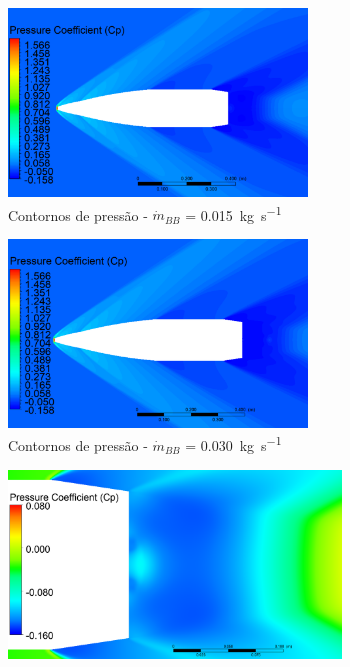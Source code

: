 \begin{figure}[!ht]
	\centering
	\begin{subfigure}[b]{0.47\textwidth} %
        \centering
        \includegraphics[height=5cm,width=\textwidth]{contorno-pressao-2306-vazao-0015-1pol.png}
        \caption{Contornos de pressão - \(\Dot{m}_{BB}\) = \qty{0,015}{\kilogram\per\second}}
        \label{fig:contorno-pressao-bb-1pol-vazao0015}
    \end{subfigure}
    \hfill
    \begin{subfigure}[b]{0.47\textwidth} %
        \centering
        \includegraphics[height=5cm,width=\textwidth]{contorno-pressao-2306-vazao-0030-1pol.png}
        \caption{Contornos de pressão - \(\Dot{m}_{BB}\) = \qty{0,030}{\kilogram\per\second}}
        \label{fig:contorno-pressao-bb-1pol-vazao0030}
    \end{subfigure}
    \hfill
    \begin{subfigure}[b]{0.47\textwidth} %
        \centering
        \includegraphics[height=5cm,width=\textwidth]{coeficientepressao-vazao0015-temp2306-diam1pol.png}

\end{subfigure}
\end{figure}
